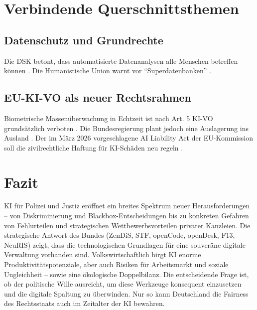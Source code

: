 \documentclass[12pt,a4paper]{article}
\begin{document}
	\section{Verbindende Querschnittsthemen}
	
	\subsection{Datenschutz und Grundrechte}
	
	Die DSK betont, dass automatisierte Datenanalysen alle Menschen betreffen können \cite{DSK2025}. Die Humanistische Union warnt vor \enquote{Superdatenbanken} \cite{HumanUnion2025}.
	
	\subsection{EU-KI-VO als neuer Rechtsrahmen}
	
	Biometrische Massenüberwachung in Echtzeit ist nach Art. 5 KI-VO grundsätzlich verboten \cite{RAV2025}. Die Bundesregierung plant jedoch eine Auslagerung ins Ausland \cite{Gruene2026}. Der im März 2026 vorgeschlagene AI Liability Act der EU-Kommission soll die zivilrechtliche Haftung für KI-Schäden neu regeln \cite{EUAILiability2026}.
	
	\section{Fazit}
	
	KI für Polizei und Justiz eröffnet ein breites Spektrum neuer Herausforderungen – von Diskriminierung und Blackbox-Entscheidungen bis zu konkreten Gefahren von Fehlurteilen und strategischen Wettbewerbsvorteilen privater Kanzleien. Die strategische Antwort des Bundes (ZenDiS, STF, openCode, openDesk, F13, NeuRIS) zeigt, dass die technologischen Grundlagen für eine souveräne digitale Verwaltung vorhanden sind. Volkswirtschaftlich birgt KI enorme Produktivitätspotenziale, aber auch Risiken für Arbeitsmarkt und soziale Ungleichheit – sowie eine ökologische Doppelbilanz. Die entscheidende Frage ist, ob der politische Wille ausreicht, um diese Werkzeuge konsequent einzusetzen und die digitale Spaltung zu überwinden. Nur so kann Deutschland die Fairness des Rechtsstaats auch im Zeitalter der KI bewahren.
	
\end{document}
